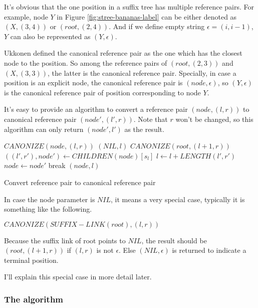 \documentclass{article}
\begin{document}
It's obvious that the one position in a suffix tree has multiple reference pairs.
For example, node $Y$ in Figure \ref{fig:stree-bananas-label} can be either
denoted as $(X, (3, 4))$ or $(root, (2, 4))$. And if we define empty string 
$\epsilon=(i, i-1)$, $Y$ can also be represented as $(Y, \epsilon)$.

Ukkonen defined the canonical reference pair as the one which has the closest node
to the position. So among the reference pairs of $(root, (2, 3))$ and $(X, (3, 3))$,
the latter is the canonical reference pair. Specially, in case a position is an
explicit node, the canonical reference pair is $(node, \epsilon)$, so $(Y, \epsilon)$
is the canonical reference pair of position corresponding to node $Y$.

It's easy to provide an algorithm to convert a reference pair $(node, (l, r))$ 
to canonical reference pair $(node', (l', r))$. Note that $r$ won't be changed,
so this algorithm can only return $(node', l')$ as the result.

\begin{algorithm}
\begin{algorithmic}
\STATE $CANONIZE(node, (l, r))$
      \RETURN $(NIL, l)$
    \ELSE
      \RETURN $CANONIZE(root, (l+1, r))$
    \ENDIF
  \ENDIF
    \STATE $((l', r'), node') \leftarrow CHILDREN(node)[s_l]$
      \STATE $l \leftarrow l+LENGTH(l', r')$
      \STATE $node \leftarrow node'$
    \ELSE
      \STATE break
    \ENDIF
  \ENDWHILE
  \RETURN $(node, l)$
\end{algorithmic}
\caption{Convert reference pair to canonical reference pair}
\label{algo:strie1}
\end{algorithm}

In case the node parameter is $NIL$, it means a very special case, typically it is something
like the following.

$CANONIZE(SUFFIX-LINK(root), (l, r))$

Because the suffix link of root points to $NIL$, the result should be $(root, (l+1, r))$
if $(l, r)$ is not $\epsilon$. Else $(NIL, \epsilon)$ is returned to indicate
a terminal position.

I'll explain this special case in more detail later.

\subsubsection{The algorithm}
\end{document}
